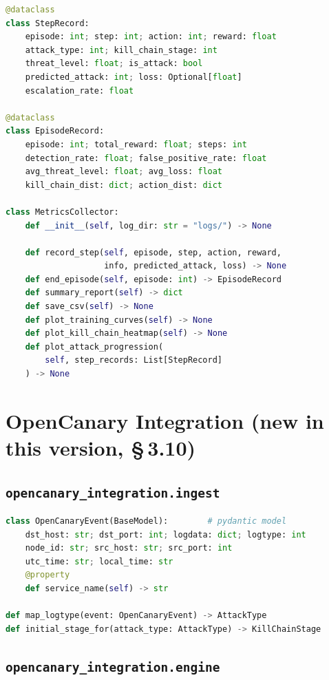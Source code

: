 \begin{lstlisting}[language=Python, caption={\texttt{MetricsCollector} interface (unchanged).}]
@dataclass
class StepRecord:
    episode: int; step: int; action: int; reward: float
    attack_type: int; kill_chain_stage: int
    threat_level: float; is_attack: bool
    predicted_attack: int; loss: Optional[float]
    escalation_rate: float

@dataclass
class EpisodeRecord:
    episode: int; total_reward: float; steps: int
    detection_rate: float; false_positive_rate: float
    avg_threat_level: float; avg_loss: float
    kill_chain_dist: dict; action_dist: dict

class MetricsCollector:
    def __init__(self, log_dir: str = "logs/") -> None

    def record_step(self, episode, step, action, reward,
                    info, predicted_attack, loss) -> None
    def end_episode(self, episode: int) -> EpisodeRecord
    def summary_report(self) -> dict
    def save_csv(self) -> None
    def plot_training_curves(self) -> None
    def plot_kill_chain_heatmap(self) -> None
    def plot_attack_progression(
        self, step_records: List[StepRecord]
    ) -> None
\end{lstlisting}

\section{OpenCanary Integration (new in this version, \S\,3.10)}

\subsection{\texttt{opencanary\_integration.ingest}}

\begin{lstlisting}[language=Python, caption={OpenCanary event ingestion and attack-type/stage mapping interface.}]
class OpenCanaryEvent(BaseModel):        # pydantic model
    dst_host: str; dst_port: int; logdata: dict; logtype: int
    node_id: str; src_host: str; src_port: int
    utc_time: str; local_time: str
    @property
    def service_name(self) -> str

def map_logtype(event: OpenCanaryEvent) -> AttackType
def initial_stage_for(attack_type: AttackType) -> KillChainStage
\end{lstlisting}

\subsection{\texttt{opencanary\_integration.engine}}

